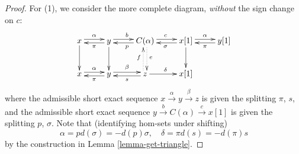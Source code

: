 \documentclass{stacks-project}
\theoremstyle{plain}
\theoremstyle{definition}
\theoremstyle{remark}
\numberwithin{equation}{subsection}
\begin{document}
\begin{proof}
For (1), we consider the more complete diagram, \emph{without} the
sign change on $c$:
$$
\xymatrix{
x\ar@<0.5ex>[r]^{\alpha} \ar[d] &
y\ar@<0.5ex>[l]^{\pi} \ar@<0.5ex>[r]^{b}\ar[d] &
C(\alpha)\ar@<0.5ex>[l]^{p} \ar@<0.5ex>[r]^{c}\ar@{.>}@<0.5ex>[d]^{e} &
x[1]\ar@<0.5ex>[l]^{\sigma} \ar[d]\ar@<0.5ex>[r]^{\alpha} &
y[1]\ar@<0.5ex>[l]^{\pi} \\
x\ar@<0.5ex>[r]^{\alpha} &
y\ar@<0.5ex>[r]^{\beta} \ar@<0.5ex>[l]^{\pi} &
z\ar[r]^{\delta}\ar@<0.5ex>[l]^{s} \ar@{.>}@<0.5ex>[u]^{f} &
x[1]
}
$$
where the admissible short exact sequence
$x\xrightarrow{\alpha} y\xrightarrow{\beta} z$
is given the splitting $\pi$, $s$, and the admissible short exact sequence
$y\xrightarrow{b}C(\alpha)\xrightarrow{c}x[1]$ is given the splitting
$p$, $\sigma$. Note that (identifying hom-sets under shifting)
$$
\alpha = pd(\sigma) = -d(p)\sigma,\quad
\delta = \pi d(s) = -d(\pi)s
$$
by the construction in Lemma \ref{lemma-get-triangle}.


\end{proof}
\end{document}

